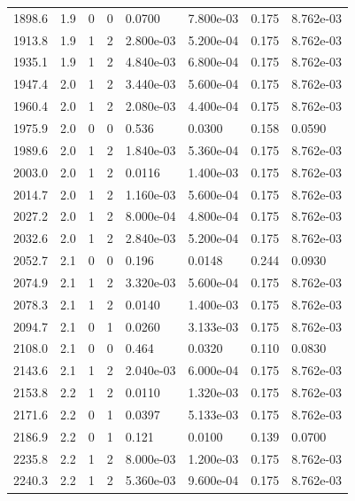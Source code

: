 \documentclass[preview]{standalone}
\begin{document}
{{{{{\begin{tabular}{L{1.2cm}C{1.2cm} C{0.3cm}C{0.5cm} C{1.4cm}C{1.4cm} C{1.4cm}C{1.4cm}}
  1898.6  &   1.9  & 0     &  0 &  0.0700  & 7.800e-03  & 0.175 &  8.762e-03   \\ 
  1913.8  &   1.9  & 1     &  2 &  2.800e-03  & 5.200e-04  & 0.175 &  8.762e-03   \\ 
  1935.1  &   1.9  & 1     &  2 &  4.840e-03  & 6.800e-04  & 0.175 &  8.762e-03   \\ 
  1947.4  &   2.0  & 1     &  2 &  3.440e-03  & 5.600e-04  & 0.175 &  8.762e-03   \\ 
  1960.4  &   2.0  & 1     &  2 &  2.080e-03  & 4.400e-04  & 0.175 &  8.762e-03   \\ 
  1975.9  &   2.0  & 0     &  0 &  0.536  & 0.0300  & 0.158 &  0.0590   \\ 
  1989.6  &   2.0  & 1     &  2 &  1.840e-03  & 5.360e-04  & 0.175 &  8.762e-03   \\ 
  2003.0  &   2.0  & 1     &  2 &  0.0116  & 1.400e-03  & 0.175 &  8.762e-03   \\ 
  2014.7  &   2.0  & 1     &  2 &  1.160e-03  & 5.600e-04  & 0.175 &  8.762e-03   \\ 
  2027.2  &   2.0  & 1     &  2 &  8.000e-04  & 4.800e-04  & 0.175 &  8.762e-03   \\ 
  2032.6  &   2.0  & 1     &  2 &  2.840e-03  & 5.200e-04  & 0.175 &  8.762e-03   \\ 
  2052.7  &   2.1  & 0     &  0 &  0.196  & 0.0148  & 0.244 &  0.0930   \\ 
  2074.9  &   2.1  & 1     &  2 &  3.320e-03  & 5.600e-04  & 0.175 &  8.762e-03   \\ 
  2078.3  &   2.1  & 1     &  2 &  0.0140  & 1.400e-03  & 0.175 &  8.762e-03   \\ 
  2094.7  &   2.1  & 0     &  1 &  0.0260  & 3.133e-03  & 0.175 &  8.762e-03   \\ 
  2108.0  &   2.1  & 0     &  0 &  0.464  & 0.0320  & 0.110 &  0.0830   \\ 
  2143.6  &   2.1  & 1     &  2 &  2.040e-03  & 6.000e-04  & 0.175 &  8.762e-03   \\ 
  2153.8  &   2.2  & 1     &  2 &  0.0110  & 1.320e-03  & 0.175 &  8.762e-03   \\ 
  2171.6  &   2.2  & 0     &  1 &  0.0397  & 5.133e-03  & 0.175 &  8.762e-03   \\ 
  2186.9  &   2.2  & 0     &  1 &  0.121  & 0.0100  & 0.139 &  0.0700   \\ 
  2235.8  &   2.2  & 1     &  2 &  8.000e-03  & 1.200e-03  & 0.175 &  8.762e-03   \\ 
  2240.3  &   2.2  & 1     &  2 &  5.360e-03  & 9.600e-04  & 0.175 &  8.762e-03   \\ 

\end{tabular}}}}}}
\end{document}
